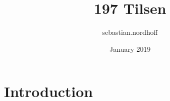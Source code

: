 \documentclass{article}
\title{197 Tilsen}
\author{sebastian.nordhoff }
\date{January 2019}
\begin{document}
\maketitle

\section{Introduction}
\end{document}
